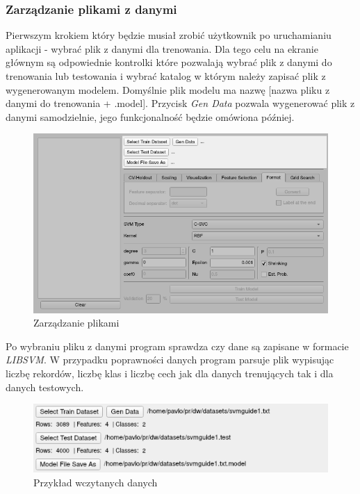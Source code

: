 \documentclass[paper=a4, fontsize=11pt]{scrartcl} %
\numberwithin{equation}{section} %
\numberwithin{figure}{section} %
\begin{document}
\subsubsection{Zarządzanie plikami z danymi}

    \par Pierwszym krokiem który będzie musiał zrobić użytkownik po uruchamianiu aplikacji -
    wybrać plik z danymi dla trenowania. Dla tego celu na ekranie głównym są odpowiednie
    kontrolki które pozwalają wybrać plik z danymi do trenowania lub testowania i wybrać
    katalog w którym należy zapisać plik z wygenerowanym modelem. Domyślnie plik modelu ma
    nazwę [nazwa pliku z danymi do trenowania + .model]. Przycisk \textit{Gen Data} pozwala
    wygenerować plik z danymi samodzielnie, jego funkcjonalność będzie omówiona później.

    \begin{figure}[h]
        \begin{center}
            \includegraphics[scale=0.7]{./img/svm_app_mainw_filehandler.png}
            \caption{Zarządzanie plikami}
            \label{fig:file_handler}
        \end{center}
    \end{figure}

    \par Po wybraniu pliku z danymi program sprawdza czy dane są zapisane w formacie
    \textit{LIBSVM}. W przypadku poprawności danych program parsuje plik wypisując liczbę
    rekordów, liczbę klas i liczbę cech jak dla danych trenujących tak i dla danych testowych.

    \begin{figure}[h]
        \begin{center}
            \includegraphics[scale=0.8]{./img/svm_app_mainw_filehandler_ex.png}
            \caption{Przykład wczytanych danych}
            \label{fig:files_example1}
        \end{center}
    \end{figure}
\end{document}
